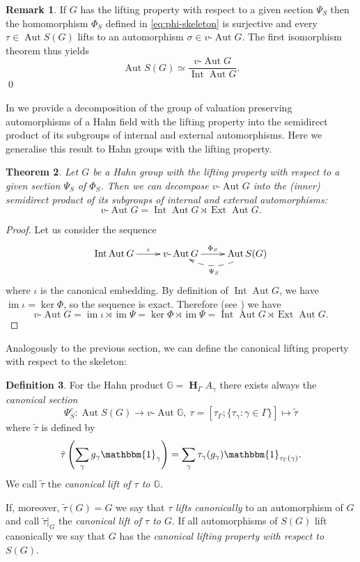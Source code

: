 \documentclass[12pt,a4paper,reqno,openright]{amsart}
\newcommand{\bbG}{{\mathbb G}}
\renewcommand{\1}{\mathbbm{1}}
\DeclareMathOperator{\Aut}{Aut}
\DeclareMathOperator{\Ext}{Ext}
\DeclareMathOperator{\Int}{Int}
\DeclareMathOperator{\im}{im}
\newcommand{\vAut}{v\text{-}\Aut}
\newcommand{\GG}{\bbG}
\DeclareMathOperator*\HH{\mathbf{H}}
\theoremstyle{definition}
\newtheorem{defn}{Definition}[section]
\theoremstyle{plain}
\theoremstyle{plain}
\theoremstyle{plain}
\theoremstyle{plain}
\theoremstyle{plain}
\newtheorem{theorem}[defn]{Theorem}
\theoremstyle{plain}
\theoremstyle{plain}
\theoremstyle{plain}
\theoremstyle{definition}
\theoremstyle{definition}
\theoremstyle{plain}
\theoremstyle{definition}
\theoremstyle{definition}
\newtheorem{rmk}[defn]{Remark}
\theoremstyle{plain}
\theoremstyle{plain}
\theoremstyle{plain}
\begin{document}
\begin{rmk}
	If $ G $ has the lifting property with respect to a given section $ \Psi_S $ then the homomorphism $ \Phi_S $
	defined in \eqref{eq:phi-skeleton} is surjective and every $ \tau\in\Aut S(G) $ lifts to an automorphism $ \sigma\in\vAut G $. The first isomorphism theorem thus yields
	\[
	\Aut S(G)\simeq\frac{\vAut G}{\Int\Aut G}.
	\]
\qed\end{rmk}

In \cite[Section~3]{ours-fields} we provide a decomposition of the group of valuation preserving automorphisms of a Hahn field with the lifting property into the semidirect product of its subgroups of internal and external automorphisms. Here we generalise this result to Hahn groups with the lifting property.

\begin{theorem}
	\label{hofberger-groups}
	Let $G$ be a Hahn group with the lifting property with respect to a given section $ \Psi_S $ of $ \Phi_S $.
	Then we can decompose $ \vAut G $ into the (inner) semidirect product of its subgroups of internal and external automorphisms:
	$$\vAut G = \Int\Aut G \rtimes \Ext\Aut G.$$
\end{theorem}
\begin{proof}
	Let us consider
	the sequence
	$$
	\xymatrix{ 
		\Int\Aut G \ar[r]^-\iota &
		\vAut G \ar[r]^-{\Phi_S} &
		\Aut S(G) \ar@{-->}@/^1pc/[l]^{\Psi_S}
	}
	$$
	where $\iota$ is the canonical embedding. By definition of $ \Int\Aut G $, we have $\im \iota = \ker\Phi$, so the sequence is exact. Therefore (see \cite[Theorem~3.3]{conrad-note-splitting}) we have
	\[
	\vAut G = \im \iota \rtimes \im \Psi = \ker\Phi\rtimes \im\Psi 
	= \Int\Aut G \rtimes \Ext\Aut G.
	\]
\end{proof}

Analogously to the previous section, we can define the canonical lifting property with respect to the skeleton: 

\begin{defn}\label{def:can-lift-prop-skeleton}
	For the Hahn product $ \GG = \HH_\Gamma A_\gamma $ there exists always the \emph{canonical section}
	\[
	\Psi^c_S\colon \Aut S(G)\to \vAut \GG,\ \tau = [\tau_\Gamma;\{\tau_\gamma : \gamma\in\Gamma \}]\longmapsto \tilde\tau
	\]
	where $ \tilde\tau $ is defined by
	\[
	\tilde\tau\left( \sum_\gamma g_\gamma\1_\gamma\right) = \sum_\gamma \tau_\gamma(g_\gamma)\1_{\tau_\Gamma(\gamma)}.
	\]
	We call $ \tilde\tau $ the \emph{canonical lift of $ \tau $ to $ \GG $.}
	
	\noindent If, moreover, $ \tilde\tau(G) = G $ we say that $ \tau $ \emph{lifts canonically} to an automorphism of $ G $ and call $ \tilde\tau|_G $ the \emph{canonical lift of $ \tau $ to $ G $}. If all automorphisms of $ S(G) $ lift canonically we say that $ G $ has the \emph{canonical lifting property with respect to} $ S(G) $.
\end{defn}
\end{document}
